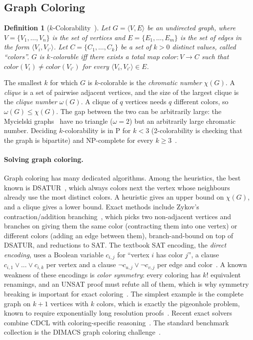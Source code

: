\documentclass[12pt,a4paper]{article}
\newtheorem{definition}{Definition}
\theoremstyle{definition}
\begin{document}
\subsection{Graph Coloring}

\begin{definition}[$k$-Colorability~\cite{GareyJ79}]
Let $G = \langle V, E \rangle$ be an undirected graph, where
$V = \{V_1, \dots, V_n\}$ is the set of vertices and $E = \{E_1, \dots, E_m\}$ is
the set of edges in the form $\langle V_i, V_{i'} \rangle$. Let
$C = \{C_1, \dots, C_k\}$ be a set of $k > 0$ distinct values, called ``colors''.
$G$ is \emph{$k$-colorable} iff there exists a total map
$\mathit{color} : V \to C$ such that
$\mathit{color}(V_i) \neq \mathit{color}(V_{i'})$ for every
$\langle V_i, V_{i'} \rangle \in E$.
\end{definition}

The smallest $k$ for which $G$ is $k$-colorable is the \emph{chromatic number}
$\chi(G)$. A \emph{clique} is a set of pairwise adjacent vertices, and the size of
the largest clique is the \emph{clique number} $\omega(G)$. A clique of $q$
vertices needs $q$ different colors, so $\omega(G) \leq \chi(G)$. The gap between
the two can be arbitrarily large: the Mycielski graphs~\cite{Mycielski55} have no
triangle ($\omega = 2$) but an arbitrarily large chromatic number. Deciding
$k$-colorability is in P for $k < 3$ (2-colorability is checking that the graph is
bipartite) and NP-complete for every $k \geq 3$~\cite{GareyJ79}.

\paragraph{Solving graph coloring.}
Graph coloring has many dedicated algorithms. Among the heuristics, the best known
is DSATUR~\cite{Brelaz79}, which always colors next the vertex whose neighbours
already use the most distinct colors. A heuristic gives an upper bound on
$\chi(G)$, and a clique gives a lower bound. Exact methods include Zykov's
contraction/addition branching~\cite{Zykov49}, which picks two non-adjacent
vertices and branches on giving them the same color (contracting them into one
vertex) or different colors (adding an edge between them), branch-and-bound on top
of DSATUR, and reductions to SAT. The textbook SAT encoding, the \emph{direct
encoding}, uses a Boolean variable $c_{i,j}$ for ``vertex $i$ has color $j$'', a
clause $c_{i,1} \vee \dots \vee c_{i,k}$ per vertex and a clause
$\neg c_{u,j} \vee \neg c_{v,j}$ per edge and color~\cite{VanGelder08}. A known
weakness of these encodings is \emph{color symmetry}: every coloring has $k!$
equivalent renamings, and an UNSAT proof must refute all of them, which is
why symmetry breaking is important for exact coloring~\cite{RamaniAMS06}. The
simplest example is the complete graph on $k+1$ vertices with $k$ colors, which is
exactly the pigeonhole problem, known to require exponentially long resolution
proofs~\cite{Haken85}. Recent exact solvers combine CDCL with coloring-specific
reasoning~\cite{HebrardK18}. The standard benchmark collection is the DIMACS
graph coloring challenge~\cite{JohnsonT96}.
\end{document}
